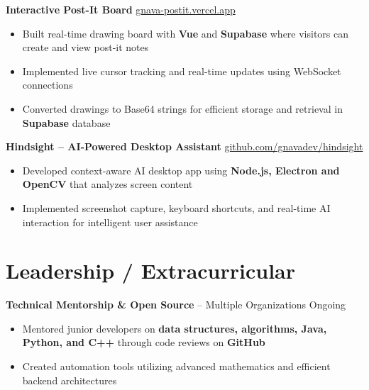 \documentclass[11pt]{article}
\begin{document}
\vspace{-4pt}

\textbf{Interactive Post-It Board} \hfill \href{https://gnava-postit.vercel.app/}{gnava-postit.vercel.app} \\
\vspace{-9pt}
\begin{itemize}
  \item Built real-time drawing board with \textbf{Vue} and \textbf{Supabase} where visitors can create and view post-it notes
  \item Implemented live cursor tracking and real-time updates using WebSocket connections
  \item Converted drawings to Base64 strings for efficient storage and retrieval in \textbf{Supabase} database
\end{itemize}

\vspace{-4pt}

\textbf{Hindsight – AI-Powered Desktop Assistant} \hfill \href{https://github.com/gnavadev/hindsight}{github.com/gnavadev/hindsight} \\
\vspace{-9pt}
\begin{itemize}
  \item Developed context-aware AI desktop app using \textbf{Node.js, Electron and OpenCV} that analyzes screen content
  \item Implemented screenshot capture, keyboard shortcuts, and real-time AI interaction for intelligent user assistance
\end{itemize}
\vspace{-25pt}

\section*{Leadership / Extracurricular}
\textbf{Technical Mentorship \& Open Source} -- Multiple Organizations \hfill Ongoing \\
\vspace{-9pt}
\begin{itemize}
  \item Mentored junior developers on \textbf{data structures, algorithms, Java, Python, and C++} through code reviews on \textbf{GitHub}
  \item Created automation tools utilizing advanced mathematics and efficient backend architectures
\end{itemize}

\vspace{-25pt}
\end{document}
